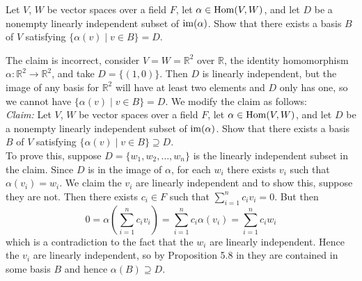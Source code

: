 \probskip

\begin{problem}[Golan 296]\hskip-2mm\protect\footnotemark
\label{prob:296}
Let $V$, $W$ be vector spaces over a field $F$, let 
$\alpha \in \operatorname{Hom}(V, W)$, and let $D$ be a nonempty linearly independent subset
of $\operatorname{im}(\alpha)$.  Show that there exists a basis $B$ of $V$ satisfying
$\{\alpha(v)\mid v \in B\} = D$.
\end{problem}
 \smallskip
 \begin{solution}
 The claim is incorrect, consider $V=W=\mathbb{R}^2$ over $\mathbb{R}$, the identity homomorphism $\alpha: \mathbb{R}^2 \rightarrow \mathbb{R}^2$, and take $D=\{(1,0)\}$. Then $D$ is linearly independent, but the image of any basis for $\mathbb{R}^2$ will have at least two elements and $D$ only has one, so we cannot have $\{\alpha(v)\mid v \in B\} = D$. We modify the claim as follows:\\

 \emph{Claim:} Let $V$, $W$ be vector spaces over a field $F$, let 
$\alpha \in \operatorname{Hom}(V, W)$, and let $D$ be a nonempty linearly independent subset
of $\operatorname{im}(\alpha)$.  Show that there exists a basis $B$ of $V$ satisfying
$\{\alpha(v)\mid v \in B\} \supseteq D$.\\

To prove this, suppose $D = \{w_1, w_2, \ldots, w_n\}$ is the linearly independent subset in the claim. Since $D$ is in the image of $\alpha$, for each $w_i$ there exists $v_i$ such that $\alpha (v_i) = w_i$. We claim the $v_i$ are linearly independent and to show this, suppose they are not. Then there exists $c_i \in F$ such that $\sum _{i=1}^nc_iv_i = 0$. But then 
$$
0 = \alpha\left( \sum _{i=1}^nc_iv_i \right) = \sum _{i=1}^nc_i \alpha(v_i) = \sum _{i=1}^nc_iw_i
$$
which is a contradiction to the fact that the $w_i$ are linearly independent. Hence the $v_i$ are linearly independent, so by Proposition 5.8 in \cite{Golan:2012} they are contained in some basis $B$ and hence $\alpha(B) \supseteq D$.

 \end{solution}

\probskip

